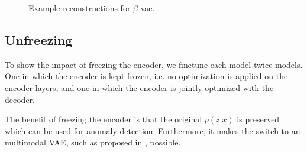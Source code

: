 \begin{figure}[!ht]
    \centering
    \caption{Example reconstructions for $\beta$-vae.}
    \label{fig:beta-vae-recon-examples}
     \quad
\end{figure}


\subsection{Unfreezing}
To show the impact of freezing the encoder, we finetune each model twice models. One in which the encoder is kept frozen, i.e. no optimization is applied on the encoder layers, and one in which the encoder is jointly optimized with the decoder.

The benefit of freezing the encoder is that the original $p(z |x)$ is preserved which can be used for anomaly detection. Furthermore, it makes the switch to an multimodal VAE, such as proposed in \cite{vasco2020mhvae}, possible.

